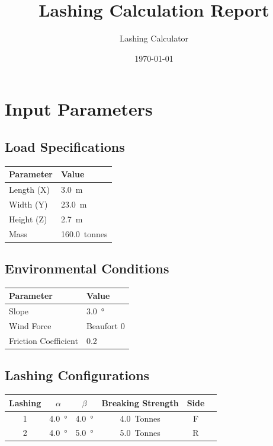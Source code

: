 \documentclass[12pt]{article}
\title{Lashing Calculation Report}
\author{Lashing Calculator}
\date{\today}
\begin{document}
\maketitle

\section{Input Parameters}

\subsection{Load Specifications}
\begin{table}[H]
\centering
\begin{tabular}{ll}
\toprule
Parameter & Value \\
\midrule
Length (X) & \SI{3.0}{m} \\
Width (Y) & \SI{23.0}{m} \\
Height (Z) & \SI{2.7}{m} \\
Mass & \SI{160.0}{tonnes} \\
\bottomrule
\end{tabular}
\end{table}

\subsection{Environmental Conditions}
\begin{table}[H]
\centering
\begin{tabular}{ll}
\toprule
Parameter & Value \\
\midrule
Slope & \SI{3.0}{\degree} \\
Wind Force & Beaufort 0 \\
Friction Coefficient & 0.2 \\
\bottomrule
\end{tabular}
\end{table}

\subsection{Lashing Configurations}
\begin{table}[H]
\centering
\begin{tabular}{cccccc}
\toprule
Lashing & $\alpha$ & $\beta$ & Breaking Strength & Side \\
\midrule
1 & \SI{4.0}{\degree} & \SI{4.0}{\degree} & \SI{4.0}{Tonnes} & F \\
2 & \SI{4.0}{\degree} & \SI{5.0}{\degree} & \SI{5.0}{Tonnes} & R \\
\bottomrule
\end{tabular}
\end{table}
\end{document}
